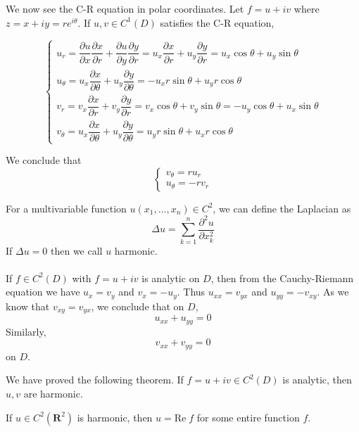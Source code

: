 \begin{defi}
We now see the C-R equation in polar coordinates. Let $f=u+iv$ where $z=x+iy=re^{i\theta }$. If $u,v\in C^{1}(D)$ satisfies the C-R equation, 
\begin{spacing}{2}
\[\begin{cases}
u_{r}=\dfrac{\partial u}{\partial x}\dfrac{\partial x}{\partial r}+\dfrac{\partial u}{\partial y}\dfrac{\partial y}{\partial r}=u_{x}\dfrac{\partial x}{\partial r}+u_{y}\dfrac{\partial y}{\partial r}=u_{x}\cos \theta +u_{y}\sin \theta  \\
u_{\theta }=u_{x}\dfrac{\partial x}{\partial \theta }+u_{y}\dfrac{\partial y}{\partial \theta }=-u_{x}r\sin \theta +u_{y}r\cos \theta \\
v_{r}=v_{x}\dfrac{\partial x}{\partial r}+v_{y}\dfrac{\partial y}{\partial r}=v_{x}\cos \theta +v_{y}\sin \theta=-u_{y}\cos \theta +u_{x}\sin \theta  \\
v_{\theta }=u_{x}\dfrac{\partial x}{\partial \theta }+u_{y}\dfrac{\partial y}{\partial \theta }=u_{y}r\sin \theta +u_{x}r\cos \theta 
\end{cases}\]
\end{spacing}
We conclude that
\[\begin{cases}
v_{\theta }=ru_{r}\\
u_{\theta }=-rv_{r}
\end{cases}\]
\end{defi}
\vspace{2ex} 
\begin{ex}
For a multivariable function $u(x_1,\ldots ,x_{n})\in C^2$, we can define the Laplacian as 
\[\Delta u=\sum ^{n}_{k=1}\dfrac{\partial ^2u}{\partial x_{k}^2} \]
If $\Delta u=0$ then we call $u$ harmonic.
\\\\
If $f\in C^2(D)$ with $f=u+iv$ is analytic on $D$, then from the Cauchy-Riemann equation we have $u_{x}=v_{y}$ and $v_{x}=-u_{y}$. Thus $u_{xx}=v_{yx}$ and $u_{yy}=-v_{xy}$. As we know that $v_{xy}=v_{yx}$, we conclude that on $D$,
\[u_{xx}+u_{yy}=0\]
Similarly, 
\[v_{xx}+v_{yy}=0\]
on $D$.
\end{ex}
\vspace{2ex}
\begin{thm}
We have proved the following theorem. If $f=u+iv\in C^2(D)$ is analytic, then $u,v$ are harmonic.
\end{thm}
\vspace{2ex}
\begin{thm}
If $u\in C^2({\bm R}^2)$ is harmonic, then $u=\mathrm{Re}\;f$ for some entire function $f$. 
\end{thm}
